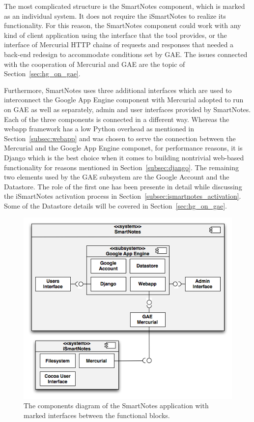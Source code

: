 The most complicated structure is the SmartNotes component, which is marked as an individual system. It does not require the iSmartNotes to realize its functionality. For this reason, the SmartNotes component could work with any kind of client application using the interface that the tool provides, or the interface of Mercurial HTTP chains of requests and responses that needed a back-end redesign to accommodate conditions set by GAE. The issues connected with the cooperation of Mercurial and GAE are the topic of Section~\ref{sec:hg_on_gae}. 

Furthermore, SmartNotes uses three additional interfaces which are used to interconnect the Google App Engine component with Mercurial adopted to run on GAE as well as separately, admin and user interfaces provided by SmartNotes. Each of the three components is connected in a different way. Whereas the webapp framework has a low Python overhead as mentioned in Section~\ref{subsec:webapp} and was chosen to serve the connection between the Mercurial and the Google App Engine componet, for performance reasons, it is Django which is the best choice when it comes to building nontrivial web-based functionality for reasons mentioned in Section~\ref{subsec:django}. The remaining two elements used by the GAE subsystem are the Google Account and the Datastore. The role of the first one has been presente in detail while discussing the iSmartNotes activation process in Section~\ref{subsec:ismartnotes_activation}. Some of the Datastore details will be covered in Section~\ref{sec:hg_on_gae}. 
\begin{figure}[ht]
\begin{center}
\includegraphics[scale=0.6]{charts/smartnotes_componets.png}
\caption{The components diagram of  the SmartNotes application with marked interfaces between the functional blocks.}
\label{fig:smartnotes_components}
\end{center}
\end{figure}

